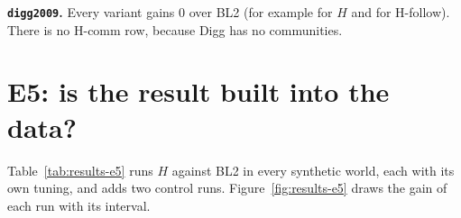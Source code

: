 \textbf{\texttt{digg2009}.} Every variant gains 0 over BL2 (for example \eFourDiggNdcgHTenAllGain{} for $H$ and \eFourDiggNdcgHFollowTenAllGain{} for H-follow). There is no H-comm row, because Digg has no communities.

\section{E5: is the result built into the data?}
\label{sec:results-e5}

Table~\ref{tab:results-e5} runs $H$ against BL2 in every synthetic world, each with its own tuning, and adds two control runs. Figure~\ref{fig:results-e5} draws the gain of each run with its interval.

\begin{table}[htbp]
  \centering
  \caption{E5: gain over BL2 in each world, NDCG@10 ($K = 10$, all users, no $p$-value). The H0 gate is the H-follow row.}
  \label{tab:results-e5}
  \small
  \resizebox{\textwidth}{!}{}
\end{table}

